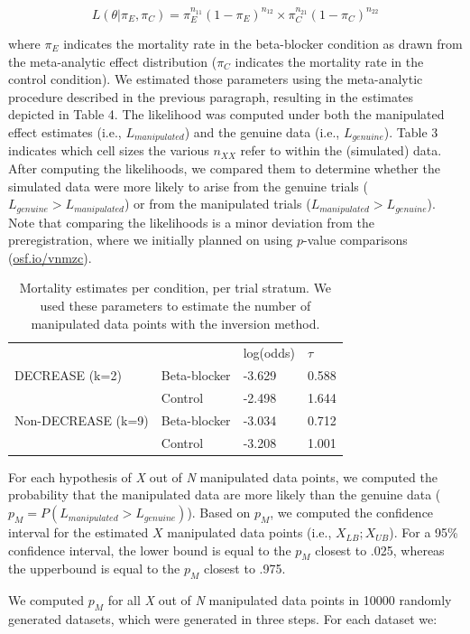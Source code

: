 \documentclass[]{article}
\begin{document}
\begin{equation}
\label{eq1}
L(\theta|\pi_{E},\pi_{C})=\pi_{E}^{n_{11}}(1-\pi_{E})^{n_{12}} \times \pi_{C}^{n_{21}}(1 - \pi_{C})^{n_{22}}
\end{equation}

where \(\pi_{E}\) indicates the mortality rate in the beta-blocker
condition as drawn from the meta-analytic effect distribution
(\(\pi_{C}\) indicates the mortality rate in the control condition). We
estimated those parameters using the meta-analytic procedure described
in the previous paragraph, resulting in the estimates depicted in Table
4. The likelihood was computed under both the manipulated effect
estimates (i.e., \(L_{manipulated}\)) and the genuine data (i.e.,
\(L_{genuine}\)). Table 3 indicates which cell sizes the various
\(n_{XX}\) refer to within the (simulated) data. After computing the
likelihoods, we compared them to determine whether the simulated data
were more likely to arise from the genuine trials
(\(L_{genuine}>L_{manipulated}\)) or from the manipulated trials
(\(L_{manipulated}>L_{genuine}\)). Note that comparing the likelihoods
is a minor deviation from the preregistration, where we initially
planned on using \(p\)-value comparisons
(\href{https://osf.io/vnmzc}{osf.io/vnmzc}).

\begin{longtable}[]{@{}llll@{}}
\caption{Mortality estimates per condition, per trial stratum. We used
these parameters to estimate the number of manipulated data points with
the inversion method.}\tabularnewline
\toprule
& & log(odds) & \(\tau\)\tabularnewline
DECREASE (k=2) & Beta-blocker & -3.629 & 0.588\tabularnewline
& Control & -2.498 & 1.644\tabularnewline
Non-DECREASE (k=9) & Beta-blocker & -3.034 & 0.712\tabularnewline
& Control & -3.208 & 1.001\tabularnewline
\bottomrule
\end{longtable}

For each hypothesis of \emph{X} out of \emph{N} manipulated data points,
we computed the probability that the manipulated data are more likely
than the genuine data (\(p_M=P(L_{manipulated}>L_{genuine})\)). Based on
\(p_M\), we computed the confidence interval for the estimated \(X\)
manipulated data points (i.e., \(X_{LB};X_{UB}\)). For a 95\% confidence
interval, the lower bound is equal to the \(p_M\) closest to .025,
whereas the upperbound is equal to the \(p_M\) closest to .975.

We computed \(p_M\) for all \emph{X} out of \emph{N} manipulated data
points in 10000 randomly generated datasets, which were generated in
three steps. For each dataset we:
\end{document}
